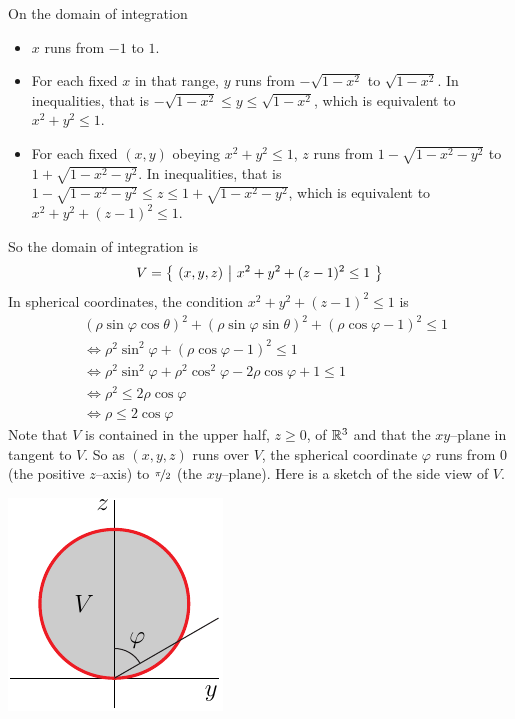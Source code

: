 \begin{solution}
On the domain of integration 
\begin{itemize}
\item
$x$ runs from $-1$ to $1$. 
\item
For each fixed $x$ in that range, $y$ runs from $-\sqrt{1-x^2}$ to
$\sqrt{1-x^2}$. In inequalities, that is $-\sqrt{1-x^2}\le y\le \sqrt{1-x^2}$,
which is equivalent to $x^2+y^2\le 1$.
\item
For each fixed $(x,y)$ obeying $x^2+y^2\le 1$, $z$ runs from
$1-\sqrt{1-x^2-y^2}$ to $1+\sqrt{1-x^2-y^2}$.
In inequalities, that is $1-\sqrt{1-x^2-y^2}\le z\le 1+\sqrt{1-x^2-y^2}$,
which is equivalent to $x^2+y^2+(z-1)^2\le 1$. 
\end{itemize}
So the domain of integration is
\begin{equation*}
V = \big\{ \ (x,y,z)\ \big|\ x^2+y^2+(z-1)^2\le 1\ \big\}
\end{equation*}
In spherical coordinates, the  condition $x^2+y^2+(z-1)^2\le 1$ is
\begin{align*}
&(\rho\sin\varphi\cos\theta)^2
+(\rho\sin\varphi\sin\theta)^2
+(\rho\cos\varphi-1)^2\le 1 \\
&\iff
\rho^2\sin^2\varphi + (\rho\cos\varphi-1)^2\le 1 \\
&\iff 
\rho^2\sin^2\varphi + \rho^2\cos^2\varphi -2 \rho\cos\varphi +1 \le 1 \\
&\iff
\rho^2\le 2\rho\cos\varphi \\
&\iff
\rho\le 2\cos\varphi
\end{align*}
Note that $V$ is contained in the upper half, $z\ge 0$, of $\mathbb{R}^3$
and that the $xy$--plane in tangent to $V$. So as $(x,y,z)$ runs over $V$,
the spherical coordinate $\varphi$ runs from $0$ (the positive $z$--axis) 
to $\nicefrac{\pi}{2}$ (the $xy$--plane). Here is a sketch of the side view
of $V$.

\begin{center}
     \includegraphics{fig/OE12D_10.pdf}
\end{center}


\end{solution}
